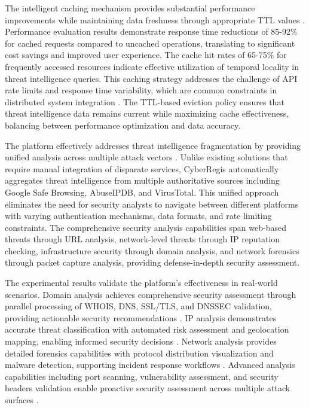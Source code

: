 \documentclass[conference]{IEEEtran}
\begin{document}
The intelligent caching mechanism provides substantial performance improvements while maintaining data freshness through appropriate TTL values \cite{b19}. Performance evaluation results demonstrate response time reductions of 85-92\% for cached requests compared to uncached operations, translating to significant cost savings and improved user experience. The cache hit rates of 65-75\% for frequently accessed resources indicate effective utilization of temporal locality in threat intelligence queries. This caching strategy addresses the challenge of API rate limits and response time variability, which are common constraints in distributed system integration \cite{b19}. The TTL-based eviction policy ensures that threat intelligence data remains current while maximizing cache effectiveness, balancing between performance optimization and data accuracy.

The platform effectively addresses threat intelligence fragmentation by providing unified analysis across multiple attack vectors \cite{b1}. Unlike existing solutions that require manual integration of disparate services, CyberRegis automatically aggregates threat intelligence from multiple authoritative sources including Google Safe Browsing, AbuseIPDB, and VirusTotal. This unified approach eliminates the need for security analysts to navigate between different platforms with varying authentication mechanisms, data formats, and rate limiting constraints. The comprehensive security analysis capabilities span web-based threats through URL analysis, network-level threats through IP reputation checking, infrastructure security through domain analysis, and network forensics through packet capture analysis, providing defense-in-depth security assessment.

The experimental results validate the platform's effectiveness in real-world scenarios. Domain analysis achieves comprehensive security assessment through parallel processing of WHOIS, DNS, SSL/TLS, and DNSSEC validation, providing actionable security recommendations \cite{b5,b9}. IP analysis demonstrates accurate threat classification with automated risk assessment and geolocation mapping, enabling informed security decisions \cite{b5,b13}. Network analysis provides detailed forensics capabilities with protocol distribution visualization and malware detection, supporting incident response workflows \cite{b5}. Advanced analysis capabilities including port scanning, vulnerability assessment, and security headers validation enable proactive security assessment across multiple attack surfaces \cite{b5,b9}.
\end{document}
